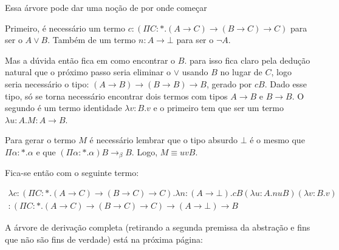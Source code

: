 \documentclass[../main.tex]{subfiles}
\begin{document}
Essa árvore pode dar uma noção de por onde começar

Primeiro, é necessário um termo $c : (\Pi C : \ast . (A \to C) \to (B \to C) \to C)$ para ser o $A \lor B$. Também de um termo $n : A \to \bot$ para ser o $\neg A$.

Mas a dúvida então fica em como encontrar o $B$. para isso fica claro pela dedução natural que o próximo passo seria eliminar o $\lor$ usando $B$ no lugar de $C$, logo seria necessário o tipo: $(A \to B) \to (B \to B) \to B$, gerado por $cB$. Dado esse tipo, só se torna necessário encontrar dois termos com tipos $A \to B$ e $B \to B$. O segundo é um termo identidade $\lambda v : B . v$ e o primeiro tem que ser um termo $\lambda u : A . M : A \to B$. 

Para gerar o termo $M$ é necessário lembrar que o tipo absurdo $\bot$ é o mesmo que $\Pi \alpha : \ast . \alpha$ e que $(\Pi \alpha : \ast . \alpha)B \to_{\beta} B$. Logo, $M \equiv uvB$.

Fica-se então com o seguinte termo:

\begin{align*}
    \lambda c : (\Pi C : \ast . (A \to C) \to (B \to C) \to C) . \lambda n : (A \to \bot) . cB(\lambda u : A . nuB)(\lambda v : B . v) \\  : (\Pi C : \ast . (A \to C) \to (B \to C) \to C) \to (A \to \bot) \to B
\end{align*}


A árvore de derivação completa (retirando a segunda premissa da abstração e fins que não são fins de verdade) está na próxima página:

\newpage
\end{document}
